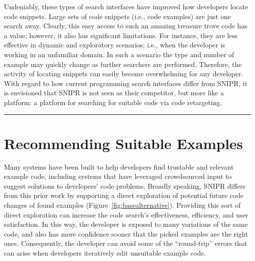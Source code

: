 Undeniably, these types of search interfaces have improved how developers locate code snippets. Large sets of code snippets (i.e., code examples) are just one search away. Clearly, this easy access to such an amazing treasure trove code has a value; however, it also has significant limitations. For instance, they are less effective in dynamic and exploratory scenarios; i.e., when the developer is working in an unfamiliar domain. In such a scenario the type and number of example may quickly change as further searchers are performed. Therefore, the activity of locating snippets can easily become overwhelming for any developer. With regard to how current programming search interfaces differ from \uppercase{SnipR}, it is envisioned that \uppercase{SnipR} is not seen as their competitor, but more like a platform: a platform for searching for suitable code via code retargeting.
% 
% 
 
\fancybreak{\pfbreakdisplay}

\section{Recommending Suitable Examples}
\label{sec:codesearch}

Many systems have been built to help developers find trustable and relevant example code, including systems that have leveraged crowdsourced input to suggest solutions to developers' code problems. Broadly speaking, \uppercase{SnipR} differs from this prior work by supporting a direct exploration of potential future code changes of found examples (Figure~\ref{fig:basealternative}). Providing this sort of direct exploration can increase the code search's effectiveness, efficiency, and user satisfaction. In this way, the developer is exposed to many variations of the same code, and also has more confidence sooner that the picked examples are the right ones. Consequently, the developer can avoid some of the ``round-trip'' errors that can arise when developers iteratively edit unsuitable example code.

